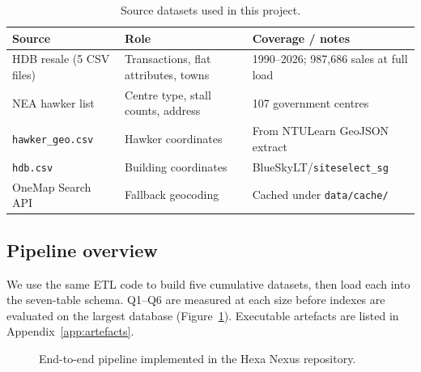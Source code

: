 \begin{table}[H]
\centering
\caption{Source datasets used in this project.}
\label{tab:datasets}
\begin{tabularx}{\textwidth}{@{}p{3.1cm}p{4.2cm}X@{}}
\toprule
Source & Role & Coverage / notes \\
\midrule
HDB resale (5 CSV files) & Transactions, flat attributes, towns & 1990--2026; 987{,}686 sales at full load \\
NEA hawker list & Centre type, stall counts, address & 107 government centres \\
\texttt{hawker\_geo.csv} & Hawker coordinates & From NTULearn GeoJSON extract \\
\texttt{hdb.csv} & Building coordinates & BlueSkyLT/\texttt{siteselect\_sg} \\
OneMap Search API & Fallback geocoding & Cached under \texttt{data/cache/} \\
\bottomrule
\end{tabularx}
\end{table}

\subsection{Pipeline overview}
We use the same ETL code to build five cumulative datasets, then load each into the seven-table schema.
Q1--Q6 are measured at each size before indexes are evaluated on the largest database (Figure~\ref{fig:pipeline}).
Executable artefacts are listed in Appendix~\ref{app:artefacts}.

\begin{figure}[H]
\centering
{}
\caption{End-to-end pipeline implemented in the Hexa Nexus repository.}
\label{fig:pipeline}
\end{figure}
